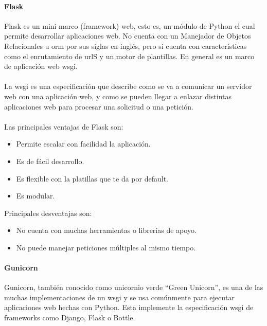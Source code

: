 \documentclass[12pt, a4paper, titlepage]{report}
\begin{document}
		   	\paragraph{Flask \\}
		   	Flask es un mini marco (framework) web, esto es, un módulo de Python el cual permite desarrollar aplicaciones web. No cuenta con un Manejador de Objetos Relacionales u \acrshort{orm} por sus siglas en inglés, pero si cuenta con características como el enrutamiento de \acrshort{url}S y un motor de plantillas. En general es un marco de aplicación web \acrshort{wsgi}.\\\\
		   	La \acrfull{wsgi} es una especificación que describe como se va a comunicar un servidor web con una aplicación web, y como se pueden llegar a enlazar distintas aplicaciones web para procesar una solicitud o una petición.\\\\
		   	Las principales ventajas de Flask son: 
		   	\begin{itemize}
		   	\item Permite escalar con facilidad la aplicación.
		   	\item Es de fácil desarrollo.
		   	\item Es flexible con la platillas que te da por default.
		   	\item Es modular.
		   	\end{itemize}
		   	
		   	Principales desventajas son: 
		   	\begin{itemize}
		   	\item No cuenta con muchas herramientas o librerías de apoyo.
		   	\item No puede manejar peticiones múltiples al mismo tiempo.
		   	\end{itemize}
		   	
		   	\paragraph{Gunicorn \\}
		   	
		   	Gunicorn, también conocido como unicornio verde “Green Unicorn”, es una de las muchas implementaciones de un \acrfull{wsgi} y se usa comúnmente para ejecutar aplicaciones web hechas con Python. Esta implemente la especificación \acrshort{wsgi} de frameworks como Django, Flask o Bottle.
\end{document}
